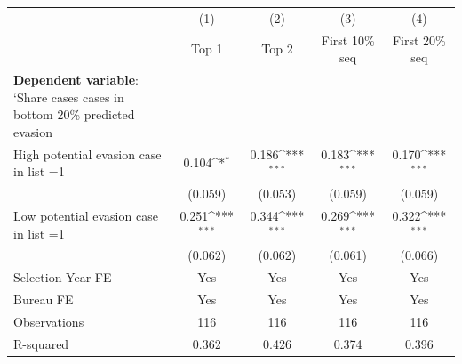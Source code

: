 {
\def\sym#1{\ifmmode^{#1}\else\(^{#1}\)\fi}
\begin{tabular}{l*{4}{c}}
\toprule
            &\multicolumn{1}{c}{(1)}&\multicolumn{1}{c}{(2)}&\multicolumn{1}{c}{(3)}&\multicolumn{1}{c}{(4)}\\
            &\multicolumn{1}{c}{Top 1}&\multicolumn{1}{c}{Top 2}&\multicolumn{1}{c}{First 10\% seq}&\multicolumn{1}{c}{First 20\% seq}\\
\midrule
\textbf{Dependent variable}: `Share cases cases in bottom 20\% predicted evasion&                     &                     &                     &                     \\
\addlinespace
High potential evasion case in list =1&       0.104\sym{*}  &       0.186\sym{***}&       0.183\sym{***}&       0.170\sym{***}\\
            &     (0.059)         &     (0.053)         &     (0.059)         &     (0.059)         \\
\addlinespace
Low potential evasion case in list =1&       0.251\sym{***}&       0.344\sym{***}&       0.269\sym{***}&       0.322\sym{***}\\
            &     (0.062)         &     (0.062)         &     (0.061)         &     (0.066)         \\
\midrule
Selection Year FE&         Yes         &         Yes         &         Yes         &         Yes         \\
Bureau FE   &         Yes         &         Yes         &         Yes         &         Yes         \\
Observations&         116         &         116         &         116         &         116         \\
R-squared   &       0.362         &       0.426         &       0.374         &       0.396         \\
\bottomrule
\end{tabular}
}
